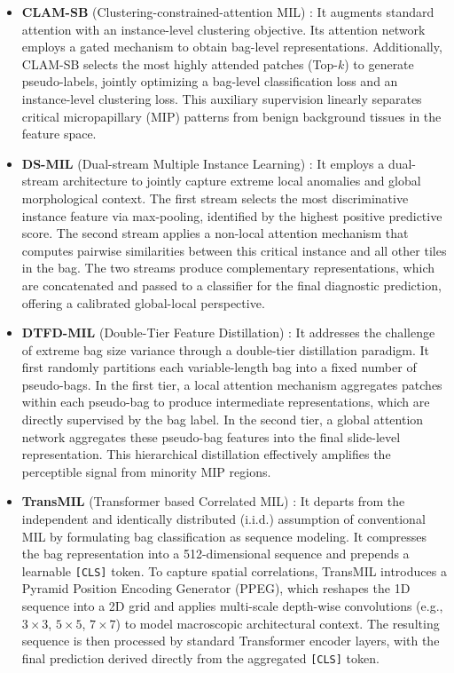 \documentclass[journal,twoside,web]{ieeecolor}
\begin{document}
\begin{itemize}
    \item \textbf{CLAM-SB} (Clustering-constrained-attention MIL) \cite{lu2021data}: It augments standard attention with an instance-level clustering objective. Its attention network employs a gated mechanism to obtain bag-level representations. Additionally, CLAM-SB selects the most highly attended patches (Top-$k$) to generate pseudo-labels, jointly optimizing a bag-level classification loss and an instance-level clustering loss. This auxiliary supervision linearly separates critical micropapillary (MIP) patterns from benign background tissues in the feature space.
    
    \item \textbf{DS-MIL} (Dual-stream Multiple Instance Learning) \cite{li2021dual}: It employs a dual-stream architecture to jointly capture extreme local anomalies and global morphological context. The first stream selects the most discriminative instance feature via max-pooling, identified by the highest positive predictive score. The second stream applies a non-local attention mechanism that computes pairwise similarities between this critical instance and all other tiles in the bag. The two streams produce complementary representations, which are concatenated and passed to a classifier for the final diagnostic prediction, offering a calibrated global-local perspective.
    
    \item \textbf{DTFD-MIL} (Double-Tier Feature Distillation) \cite{zhang2022double}: It addresses the challenge of extreme bag size variance through a double-tier distillation paradigm. It first randomly partitions each variable-length bag into a fixed number of pseudo-bags. In the first tier, a local attention mechanism aggregates patches within each pseudo-bag to produce intermediate representations, which are directly supervised by the bag label. In the second tier, a global attention network aggregates these pseudo-bag features into the final slide-level representation. This hierarchical distillation effectively amplifies the perceptible signal from minority MIP regions.
    
    \item \textbf{TransMIL} (Transformer based Correlated MIL) \cite{lu2021data, shao2021transmil}: It departs from the independent and identically distributed (i.i.d.) assumption of conventional MIL by formulating bag classification as sequence modeling. It compresses the bag representation into a 512-dimensional sequence and prepends a learnable \texttt{[CLS]} token. To capture spatial correlations, TransMIL introduces a Pyramid Position Encoding Generator (PPEG), which reshapes the 1D sequence into a 2D grid and applies multi-scale depth-wise convolutions (e.g., $3 \times 3$, $5 \times 5$, $7 \times 7$) to model macroscopic architectural context. The resulting sequence is then processed by standard Transformer encoder layers, with the final prediction derived directly from the aggregated \texttt{[CLS]} token.
\end{itemize}
\end{document}
